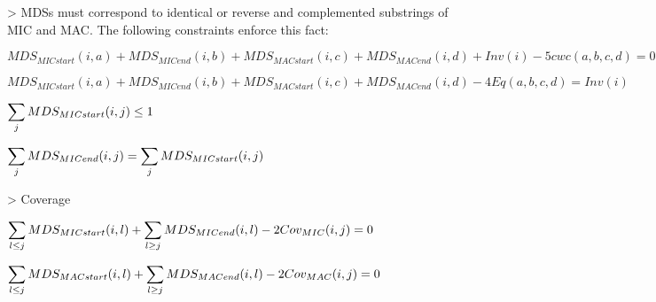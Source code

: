 > MDSs must correspond to identical or reverse and complemented substrings of MIC and MAC. The following constraints enforce this fact:

$MDS_{MICstart}(i,a) + MDS_{MICend}(i,b) + MDS_{MACstart}(i,c) + MDS_{MACend}(i,d) + Inv(i) - 5 cwc(a,b,c,d) = 0$

$MDS_{MICstart}(i,a) + MDS_{MICend}(i,b) + MDS_{MACstart}(i,c) + MDS_{MACend}(i,d) - 4 Eq(a,b,c,d) = Inv(i)$

$\mathlarger{\sum_{j} MDS_{MICstart}(i,j)\leq 1}$

$\mathlarger{\sum_{j} MDS_{MICend}(i,j) = \sum_{j} MDS_{MICstart}(i,j)}$

> Coverage

$\mathlarger{\sum_{l\leq j} MDS_{MICstart}(i,l) + \sum_{l\geq j}MDS_{MICend}(i,l) - 2Cov_{MIC}(i,j) = 0}$

$\mathlarger{\sum_{l\leq j} MDS_{MACstart}(i,l) + \sum_{l\geq j}MDS_{MACend}(i,l) - 2Cov_{MAC}(i,j) = 0}$